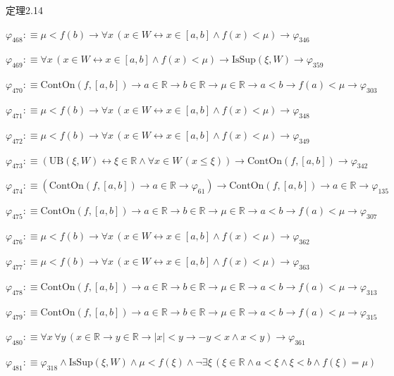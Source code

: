 \begin{fullproof}{定理2.14}
\begin{abbrevlist}
\item $\varphi_{468} :\equiv \mu < f(b) \to \forall x\,(x \in W \leftrightarrow x \in [a,b] \land f(x) < \mu) \to \varphi_{346}$
\item $\varphi_{469} :\equiv \forall x\,(x \in W \leftrightarrow x \in [a,b] \land f(x) < \mu) \to \mathrm{IsSup}(\xi,W) \to \varphi_{359}$
\item $\varphi_{470} :\equiv \mathrm{ContOn}(f,[a,b]) \to a \in \mathbb{R} \to b \in \mathbb{R} \to \mu \in \mathbb{R} \to a < b \to f(a) < \mu \to \varphi_{303}$
\item $\varphi_{471} :\equiv \mu < f(b) \to \forall x\,(x \in W \leftrightarrow x \in [a,b] \land f(x) < \mu) \to \varphi_{348}$
\item $\varphi_{472} :\equiv \mu < f(b) \to \forall x\,(x \in W \leftrightarrow x \in [a,b] \land f(x) < \mu) \to \varphi_{349}$
\item $\varphi_{473} :\equiv (\mathrm{UB}(\xi,W) \leftrightarrow \xi \in \mathbb{R} \land \forall x \in W\,(x \leq \xi)) \to \mathrm{ContOn}(f,[a,b]) \to \varphi_{342}$
\item $\varphi_{474} :\equiv (\mathrm{ContOn}(f,[a,b]) \to a \in \mathbb{R} \to \varphi_{61}) \to \mathrm{ContOn}(f,[a,b]) \to a \in \mathbb{R} \to \varphi_{135}$
\item $\varphi_{475} :\equiv \mathrm{ContOn}(f,[a,b]) \to a \in \mathbb{R} \to b \in \mathbb{R} \to \mu \in \mathbb{R} \to a < b \to f(a) < \mu \to \varphi_{307}$
\item $\varphi_{476} :\equiv \mu < f(b) \to \forall x\,(x \in W \leftrightarrow x \in [a,b] \land f(x) < \mu) \to \varphi_{362}$
\item $\varphi_{477} :\equiv \mu < f(b) \to \forall x\,(x \in W \leftrightarrow x \in [a,b] \land f(x) < \mu) \to \varphi_{363}$
\item $\varphi_{478} :\equiv \mathrm{ContOn}(f,[a,b]) \to a \in \mathbb{R} \to b \in \mathbb{R} \to \mu \in \mathbb{R} \to a < b \to f(a) < \mu \to \varphi_{313}$
\item $\varphi_{479} :\equiv \mathrm{ContOn}(f,[a,b]) \to a \in \mathbb{R} \to b \in \mathbb{R} \to \mu \in \mathbb{R} \to a < b \to f(a) < \mu \to \varphi_{315}$
\item $\varphi_{480} :\equiv \forall x\,\forall y\,(x \in \mathbb{R} \to y \in \mathbb{R} \to \lvert x \rvert < y \to -y < x \land x < y) \to \varphi_{361}$
\item $\varphi_{481} :\equiv \varphi_{318} \land \mathrm{IsSup}(\xi,W) \land \mu < f(\xi) \land \neg \exists \xi\,(\xi \in \mathbb{R} \land a < \xi \land \xi < b \land f(\xi) = \mu)$

\end{abbrevlist}
\end{fullproof}
